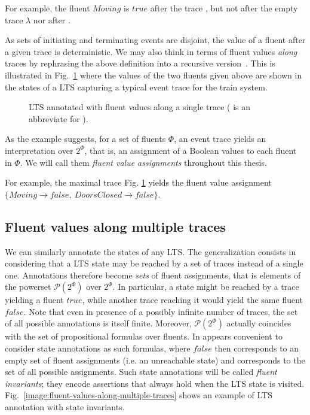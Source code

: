 For example, the fluent $Moving$ is $true$ after the trace , but not after the empty trace $\lambda$ nor after . 

As sets of initiating and terminating events are disjoint, the value of a fluent after a given trace is deterministic. We may also think in terms of fluent values \emph{along} traces by rephrasing the above definition into a recursive version~\cite{Damas:2005, Damas:2011}. This is illustrated in Fig.~\ref{image:fluent-values-along-a-trace} where the values of the two fluents given above are shown in the states of a LTS capturing a typical event trace for the train system. 

\begin{figure}[H]\centering
{}
\caption{LTS annotated with fluent values along a single trace ( is an abbreviate for ).\label{image:fluent-values-along-a-trace}}
\end{figure}

As the example suggests, for a set of fluents $\Phi$, an event trace yields an interpretation over $2^\Phi$, that is, an assignment of a Boolean values to each fluent in $\Phi$. We will call them \emph{fluent value assignments} throughout this thesis. 

For example, the maximal trace Fig. \ref{image:fluent-values-along-a-trace} yields the fluent value assignment $\{Moving \rightarrow false,~DoorsClosed \rightarrow false\}$. 

\subsection{Fluent values along multiple traces}

We can similarly annotate the states of any LTS. The generalization consists in considering that a LTS state may be reached by a set of traces instead of a single one. Annotations therefore become \emph{sets} of fluent assignments, that is elements of the powerset $\mathcal{P}(2^\Phi)$ over $2^\Phi$. In particular, a state might be reached by a trace yielding a fluent $true$, while another trace reaching it would yield the same fluent $false$. Note that even in presence of a possibly infinite number of traces, the set of all possible annotations is itself finite. Moreover, $\mathcal{P}(2^\Phi)$ actually coincides with the set of propositional formulas over fluents. In appears convenient to consider state annotations as such formulas, where $false$ then corresponds to an empty set of fluent assignments (i.e. an unreachable state) and  corresponds to the set of all possible assignments. Such state annotations will be called \emph{fluent invariants}; they encode assertions that always hold when the LTS state is visited. Fig.~\ref{image:fluent-values-along-multiple-traces} shows an example of LTS annotation with state invariants.

